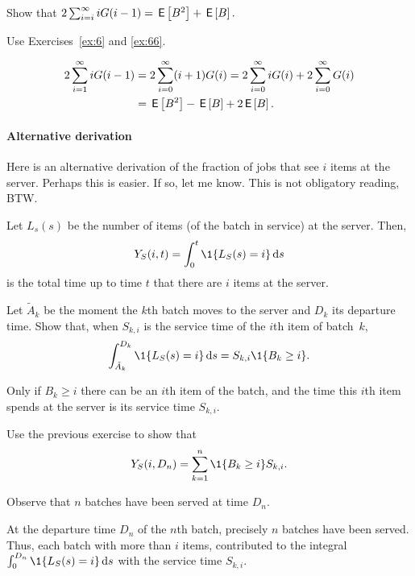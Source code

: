 \begin{exercise}\label{ex:ER}
  Show that $2 \sum_{i=i}^\infty i G(i-1)= \,\mathsf{E}\left[B^2\right] + \,\mathsf{E}\left[B\right].$
  \begin{hint}
    Use Exercises~\ref{ex:6} and \ref{ex:66}.
  \end{hint}
  \begin{solution}
\begin{equation*}
  \begin{split}
2 \sum_{i=1}^\infty i G(i-1) 
&=2\sum_{i=0}^\infty (i+1) G(i) 
=2\sum_{i=0}^\infty i G(i) +
2\sum_{i=0}^\infty G(i)\\
&= \,\mathsf{E}\left[B^2\right] - \,\mathsf{E}\left[B\right] + 2\,\mathsf{E}\left[B\right].
  \end{split}
\end{equation*}
  \end{solution}
\end{exercise}


\paragraph{Alternative derivation}
Here is an alternative derivation of the fraction of jobs that see $i$ items at the server. Perhaps this is easier. If so, let me know. This is not obligatory reading, BTW. 

Let $L_s(s)$ be the number of items (of the batch in service) at the server. Then, 
\begin{equation*}
  Y_S(i, t) = \int_0^t \1{L_S(s)=i} \d s
\end{equation*}
is the total time up to time $t$ that there are $i$ items at the server. 

\begin{exercise}
Let $\tilde A_k$ be the moment the $k$th batch moves to the server and $D_k$ its departure time. Show that, when $S_{k,i}$ is the service time of the $i$th item of batch~$k$,  
\begin{equation*}
  \int_{\tilde A_k}^{D_k} \1{L_S(s)=i} \d s = S_{k,i} \1{B_k \geq i}. 
\end{equation*}
\begin{solution}
Only if $B_k \geq i$ there can be an $i$th item of the batch, and the time this $i$th item spends at the server is its service time $S_{k,i}$.   
\end{solution}
\end{exercise}


\begin{exercise}\label{ex:14}
Use the previous exercise to show that 
\begin{equation*}
  Y_S(i, D_n) = \sum_{k=1}^n \1{B_k\geq i} S_{k,i}.
\end{equation*}
\begin{hint}
  Observe that $n$ batches have been served at time $D_n$.
\end{hint}
\begin{solution}
At the departure time $D_n$ of the $n$th batch, precisely $n$ batches have been served. Thus, each batch with more than $i$ items, contributed to the integral $\int_0^{D_n} \1{L_S(s) =i} \d s$ with the service time $S_{k,i}$. 
\end{solution}
\end{exercise}


